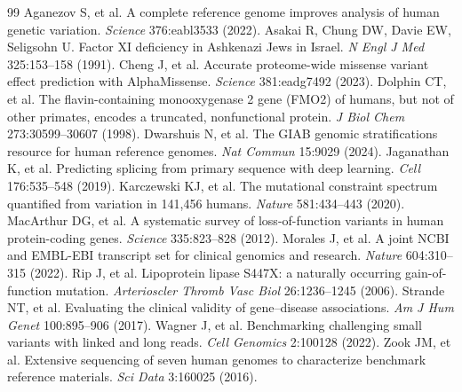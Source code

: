\documentclass[11pt]{article}
\begin{document}
\begin{thebibliography}{99}\small
{} Aganezov S, et al. A complete reference genome improves analysis of human genetic variation. \emph{Science} 376:eabl3533 (2022).
 Asakai R, Chung DW, Davie EW, Seligsohn U. Factor XI deficiency in Ashkenazi Jews in Israel. \emph{N Engl J Med} 325:153--158 (1991).
 Cheng J, et al. Accurate proteome-wide missense variant effect prediction with AlphaMissense. \emph{Science} 381:eadg7492 (2023).
 Dolphin CT, et al. The flavin-containing monooxygenase 2 gene (FMO2) of humans, but not of other primates, encodes a truncated, nonfunctional protein. \emph{J Biol Chem} 273:30599--30607 (1998).
 Dwarshuis N, et al. The GIAB genomic stratifications resource for human reference genomes. \emph{Nat Commun} 15:9029 (2024).
 Jaganathan K, et al. Predicting splicing from primary sequence with deep learning. \emph{Cell} 176:535--548 (2019).
 Karczewski KJ, et al. The mutational constraint spectrum quantified from variation in 141,456 humans. \emph{Nature} 581:434--443 (2020).
 MacArthur DG, et al. A systematic survey of loss-of-function variants in human protein-coding genes. \emph{Science} 335:823--828 (2012).
 Morales J, et al. A joint NCBI and EMBL-EBI transcript set for clinical genomics and research. \emph{Nature} 604:310--315 (2022).
 Rip J, et al. Lipoprotein lipase S447X: a naturally occurring gain-of-function mutation. \emph{Arterioscler Thromb Vasc Biol} 26:1236--1245 (2006).
 Strande NT, et al. Evaluating the clinical validity of gene--disease associations. \emph{Am J Hum Genet} 100:895--906 (2017).
 Wagner J, et al. Benchmarking challenging small variants with linked and long reads. \emph{Cell Genomics} 2:100128 (2022).
 Zook JM, et al. Extensive sequencing of seven human genomes to characterize benchmark reference materials. \emph{Sci Data} 3:160025 (2016).
\end{thebibliography}
\end{document}
